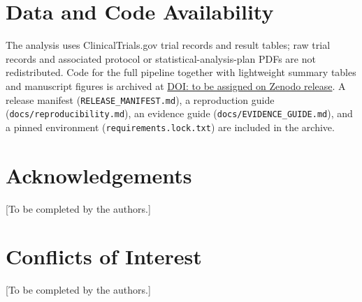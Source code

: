 \documentclass[11pt]{article}
\begin{document}
\section*{Data and Code Availability}
{\sloppy
The analysis uses ClinicalTrials.gov trial records and result tables; raw trial
records and associated protocol or statistical-analysis-plan PDFs are not
redistributed. Code for the full pipeline together with lightweight summary
tables and manuscript figures is archived at
\href{https://doi.org/}{DOI: to be assigned on Zenodo release}. A release
manifest (\texttt{RELEASE\_MANIFEST.md}), a reproduction guide
(\texttt{docs/rep\-ro\-du\-ci\-bi\-li\-ty.md}), an evidence guide
(\texttt{docs/EVIDENCE\_GUIDE.md}), and a pinned environment
(\texttt{requirements.lock.txt}) are included in the archive.
\par}

\section*{Acknowledgements}
[To be completed by the authors.]

\section*{Conflicts of Interest}
[To be completed by the authors.]
\end{document}
